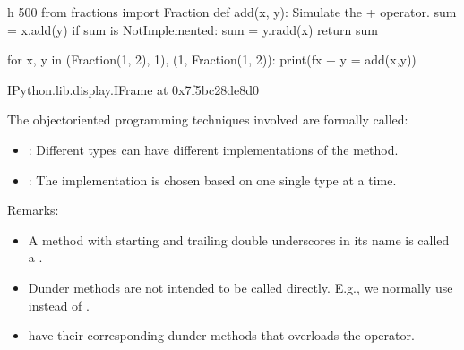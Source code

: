 \documentclass[letterpaper,10pt,english]{sphinxmanual}
\begin{document}
\begin{sphinxVerbatim}[commandchars=\\\{\}]
 \PYGZhy{}h 500
from fractions import Fraction
def add(x, y):
    \PYGZsq{}\PYGZsq{}\PYGZsq{}Simulate the + operator.\PYGZsq{}\PYGZsq{}\PYGZsq{}
    sum = x.\PYGZus{}\PYGZus{}add\PYGZus{}\PYGZus{}(y)
    if sum is NotImplemented:
        sum = y.\PYGZus{}\PYGZus{}radd\PYGZus{}\PYGZus{}(x)
    return sum


for x, y in (Fraction(1, 2), 1), (1, Fraction(1, 2)):
    print(f\PYGZsq{}\PYGZob{}x\PYGZcb{} + \PYGZob{}y\PYGZcb{} = \PYGZob{}add(x,y)\PYGZcb{}\PYGZsq{})
\end{sphinxVerbatim}

\begin{sphinxVerbatim}[commandchars=\\\{\}]
\PYGZlt{}IPython.lib.display.IFrame at 0x7f5bc28de8d0\PYGZgt{}
\end{sphinxVerbatim}

The object\sphinxhyphen{}oriented programming techniques involved are formally called:
\begin{itemize}
\item {} 
: Different types can have different implementations of the  method.

\item {} 
: The implementation is chosen based on one single type at a time.

\end{itemize}

Remarks:
\begin{itemize}
\item {} 
A method with starting and trailing double underscores in its name is called a .

\item {} 
Dunder methods are not intended to be called directly. E.g., we normally use \sphinxcode{\sphinxupquote{+}} instead of .

\item {} 
 have their corresponding dunder methods that overloads the operator.

\end{itemize}
\end{document}
